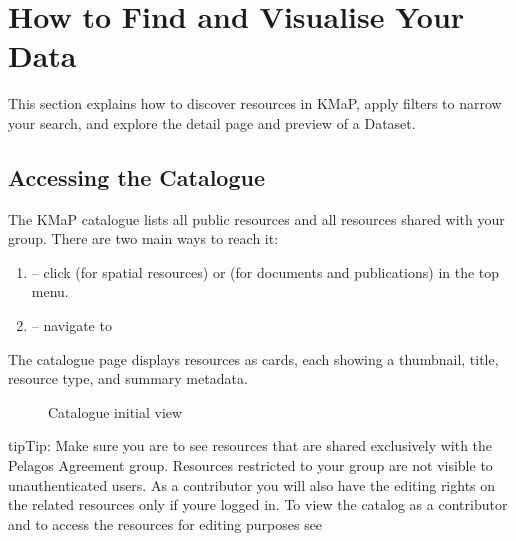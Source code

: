\documentclass[letterpaper,10pt,english]{sphinxmanual}
\begin{document}
\sphinxstepscope


\chapter{How to Find and Visualise Your Data}
\label{\detokenize{02_find_and_visualize:how-to-find-and-visualise-your-data}}\label{\detokenize{02_find_and_visualize:find-en}}\label{\detokenize{02_find_and_visualize::doc}}
\sphinxAtStartPar
This section explains how to discover resources in KMaP, apply filters to narrow your
search, and explore the detail page and preview of a Dataset.


\section{Accessing the Catalogue}
\label{\detokenize{02_find_and_visualize:accessing-the-catalogue}}
\sphinxAtStartPar
The KMaP catalogue lists all public resources and all resources shared with your group.
There are two main ways to reach it:
\begin{enumerate}
%
\item {} 
\sphinxAtStartPar
{} – click  (for spatial resources) or 
(for documents and publications) in the top menu.

\item {} 
\sphinxAtStartPar
{} – navigate to 

\end{enumerate}

\sphinxAtStartPar
The catalogue page displays resources as cards, each showing a thumbnail, title, resource
type, and summary metadata.

\begin{figure}[htbp]
\centering
\capstart

\noindent{}
\caption{Catalogue initial view}\label{\detokenize{02_find_and_visualize:id1}}\end{figure}

\begin{sphinxadmonition}{tip}{Tip:}
\sphinxAtStartPar
Make sure you are  to see resources that are shared exclusively with the
Pelagos Agreement group. Resources restricted to your group are not visible to
unauthenticated users. As a contributor you will also have the editing rights on the related resources only if youre logged in.
To view the catalog as a contributor and to access the resources for editing purposes see {\hyperref[\detokenize{03_managing_metadata:metadata-en}]{}}
\end{sphinxadmonition}
\end{document}
